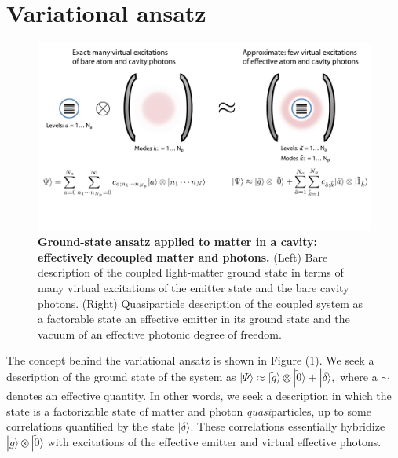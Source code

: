 \documentclass[aps,prb,twocolumn,
	groupedaddress,superscriptaddress,
	amsfonts,amssymb,amsmath,floatfix,
	citeautoscript]{revtex4-1}
\begin{document}
\section{Variational ansatz}
\begin{figure}[t]
\includegraphics[width=16cm]{conceptfigure.pdf}
\caption{\textbf{Ground-state ansatz applied to matter in a cavity: effectively decoupled matter and photons.} (Left) Bare description of the coupled light-matter ground state in terms of many virtual excitations of the emitter state and the bare cavity photons. (Right) Quasiparticle description of the coupled system as a factorable state an effective emitter in its ground state and the vacuum of an effective photonic degree of freedom.}
\label{fig:ansatz}
\end{figure}

The concept behind the variational ansatz is shown in Figure (1). We seek a description of the ground state of the system as $|\Psi\rangle \approx |\tilde{g}\rangle\otimes|\tilde{0}\rangle + |\delta\rangle,$ where a $\sim$ denotes an effective quantity. In other words, we seek a description in which the state is a factorizable state of matter and photon \textit{quasi}particles, up to some correlations quantified by the state $|\delta\rangle$. These correlations essentially hybridize $|\tilde{g}\rangle\otimes|\tilde{0}\rangle$ with excitations of the effective emitter and virtual effective photons. 
\end{document}
